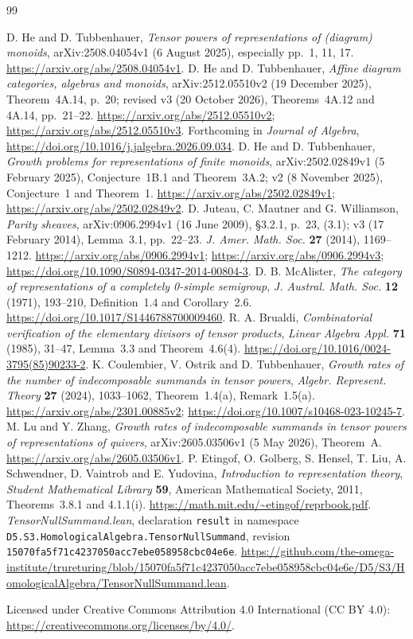 \documentclass[11pt]{article}
\begin{document}
\begin{thebibliography}{99}
\raggedright
\small
{} D. He and D. Tubbenhauer,
\emph{Tensor powers of representations of (diagram) monoids},
arXiv:2508.04054v1 (6 August 2025), especially pp.~1, 11, 17.
\url{https://arxiv.org/abs/2508.04054v1}.
 D. He and D. Tubbenhauer,
\emph{Affine diagram categories, algebras and monoids},
arXiv:2512.05510v2 (19 December 2025), Theorem~4A.14, p.~20;
revised v3 (20 October 2026), Theorems~4A.12 and 4A.14, pp.~21--22.
\url{https://arxiv.org/abs/2512.05510v2};
\url{https://arxiv.org/abs/2512.05510v3}.
Forthcoming in \emph{Journal of Algebra},
\url{https://doi.org/10.1016/j.jalgebra.2026.09.034}.
 D. He and D. Tubbenhauer,
\emph{Growth problems for representations of finite monoids},
arXiv:2502.02849v1 (5 February 2025), Conjecture~1B.1 and Theorem~3A.2;
v2 (8 November 2025), Conjecture~1 and Theorem~1.
\url{https://arxiv.org/abs/2502.02849v1};
\url{https://arxiv.org/abs/2502.02849v2}.
 D. Juteau, C. Mautner and G. Williamson,
\emph{Parity sheaves}, arXiv:0906.2994v1 (16 June 2009),
\S3.2.1, p.~23, (3.1); v3 (17 February 2014), Lemma~3.1, pp.~22--23.
\emph{J. Amer. Math. Soc.} \textbf{27} (2014), 1169--1212.
\url{https://arxiv.org/abs/0906.2994v1};
\url{https://arxiv.org/abs/0906.2994v3};
\url{https://doi.org/10.1090/S0894-0347-2014-00804-3}.
 D. B. McAlister,
\emph{The category of representations of a completely 0-simple semigroup},
\emph{J. Austral. Math. Soc.} \textbf{12} (1971), 193--210,
Definition~1.4 and Corollary~2.6.
\url{https://doi.org/10.1017/S1446788700009460}.
 R. A. Brualdi,
\emph{Combinatorial verification of the elementary divisors of tensor products},
\emph{Linear Algebra Appl.} \textbf{71} (1985), 31--47,
Lemma~3.3 and Theorem~4.6(4).
\url{https://doi.org/10.1016/0024-3795(85)90233-2}.
 K. Coulembier, V. Ostrik and D. Tubbenhauer,
\emph{Growth rates of the number of indecomposable summands in tensor powers},
\emph{Algebr. Represent. Theory} \textbf{27} (2024), 1033--1062,
Theorem~1.4(a), Remark~1.5(a).
\url{https://arxiv.org/abs/2301.00885v2};
\url{https://doi.org/10.1007/s10468-023-10245-7}.
 M. Lu and Y. Zhang,
\emph{Growth rates of indecomposable summands in tensor powers of
representations of quivers}, arXiv:2605.03506v1 (5 May 2026), Theorem~A.
\url{https://arxiv.org/abs/2605.03506v1}.
 P. Etingof, O. Golberg, S. Hensel, T. Liu, A. Schwendner,
D. Vaintrob and E. Yudovina, \emph{Introduction to representation theory},
\emph{Student Mathematical Library} \textbf{59}, American Mathematical Society,
2011, Theorems~3.8.1 and 4.1.1(i).
\url{https://math.mit.edu/~etingof/reprbook.pdf}.
 \emph{TensorNullSummand.lean},
declaration \texttt{result} in namespace
\nolinkurl{D5.S3.HomologicalAlgebra.TensorNullSummand},
revision \texttt{15070fa5f71c4237050acc7ebe058958cbc04e6e}.
\url{https://github.com/the-omega-institute/trureturing/blob/15070fa5f71c4237050acc7ebe058958cbc04e6e/D5/S3/HomologicalAlgebra/TensorNullSummand.lean}.
\end{thebibliography}
\noindent\small Licensed under Creative Commons Attribution 4.0 International
(CC BY 4.0): \url{https://creativecommons.org/licenses/by/4.0/}.
\end{document}
